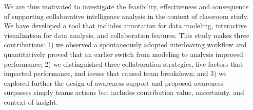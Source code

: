 We are thus motivated to investigate the feasibility, effectiveness and
consequence of supporting collaborative intelligence analysis in the context of
classroom study. We have developed a tool that includes annotation for data
modeling, interactive visualization for data analysis, and collaboration
features. This study makes three contributions: 1) we observed a spontaneously
adopted interleaving workflow and quantitatively proved that an earlier switch
from modeling to analysis improved performance; 2) we distinguished three
collaboration strategies, five factors that impacted performance, and issues
that caused team breakdown; and 3) we explored further the design of awareness
support and proposed awareness surpasses simply teams actions but includes
contribution value, uncertainty, and context of insight.
